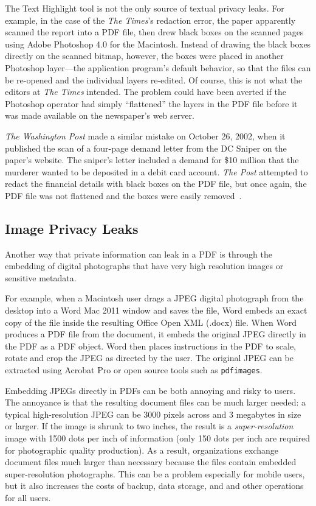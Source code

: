 \documentclass{article}
\begin{document}
The Text Highlight tool is not the only source of textual privacy
leaks. For example, in the case of the \emph{The
  Times}'s redaction error, the paper apparently scanned the report
into a PDF file, then
drew black boxes on the scanned pages using Adobe Photoshop 4.0 for
the Macintosh. Instead of drawing the black boxes directly on the
scanned bitmap, however, the boxes were placed in another Photoshop
layer---the application program's default behavior, so that
the files can be re-opened and the individual layers re-edited. Of course, this is not what
the editors at \emph{The Times}  intended. The problem could have
been averted if the Photoshop operator had simply ``flattened'' the
layers in the PDF file before it was made available on the newspaper's web server. 

\emph{The Washington Post} made a similar mistake on October 26, 2002,
when it published the scan of a four-page demand letter from the DC
Sniper on the paper's website. The sniper's letter included a demand
for \$10 million that the murderer wanted to be deposited in a debit
card account. \emph{The Post} attempted to redact
the financial details with black boxes on the PDF file, but once
again, the PDF file was not flattened and the boxes were easily removed~\cite[p.152]{internet-forensics}.

\subsection{Image Privacy Leaks}

Another way that private information can leak in a PDF is through the
embedding of digital photographs that have very high resolution images or
sensitive metadata.

For example, when a Macintosh user drags a JPEG digital photograph from
the desktop into a Word Mac 2011 window and saves the file, Word embeds an
exact copy of the file inside the resulting Office Open XML (.docx)
file. When Word produces a PDF file from the document, it embeds the
original JPEG directly in the PDF as a PDF object. Word then places
instructions in the PDF to scale, rotate and crop the JPEG as directed
by the user. The original JPEG can be extracted using Acrobat Pro or open source
tools such as \texttt{pdfimages}. 

Embedding JPEGs directly in PDFs
can be both annoying and  risky to
users. The annoyance is that the resulting document files  can
be much larger needed: a typical high-resolution JPEG
can be 3000 pixels across and 3
megabytes in size or larger. If the image is shrunk  to two
inches, the result is a \emph{super-resolution} image with 1500 dots
per inch of information (only 150 dots per inch are required for
photographic quality production). As a result,  organizations exchange
document files  much larger than necessary because the files
contain embedded super-resolution photographs. This can be a
problem especially for mobile users, but it also increases the costs of backup,
data storage, and and other operations for all users.
\end{document}
